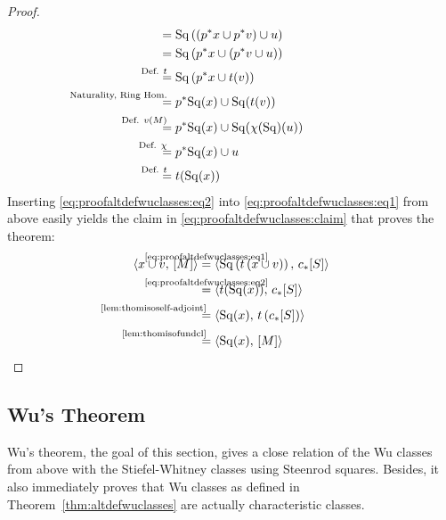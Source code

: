\begin{Thm}
\begin{proof}
\begin{align}
      &=
        \SQ\left(\left(\pb p x\cup \pb p\Vu\right) \cup \U\right)
      \\\notag
      &=
        \SQ\left(\pb p x\cup \left(\pb p\Vu \cup \U\right)\right)
      \\\notag
      &\equalsby{Def. $\thomiso$}
       \SQ\left(\pb p x\cup \thomiso(\Vu)\right)
      \\\notag
      &\equalsby{Naturality, Ring Hom.}
        \pb p\SQ(x) \cup \SQ(\thomiso(\Vu))
      \\\notag
      &\equalsby{Def. $\V{M}$}
        \pb p\SQ(x) \cup \SQ(\antipode(\SQ)(u))
      \\\notag
      &\equalsby{Def. $\antipode$}
        \pb p\SQ(x) \cup u
      \\\label{eq:proofaltdefwuclasses:eq2}
      &\equalsby{Def. $\thomiso$}
        \thomiso(\SQ(x))
    \end{align}
    Inserting \eqref{eq:proofaltdefwuclasses:eq2} into
    \eqref{eq:proofaltdefwuclasses:eq1} from above easily yields the
    claim in \eqref{eq:proofaltdefwuclasses:claim} that proves the theorem:
    \begin{align*}
      \capped{x\cup \Vu}{\fundcl M}
      &\cequalsby{\eqref{eq:proofaltdefwuclasses:eq1}}
        \capped
        {\SQ\left(\thomiso\left(x\cup\Vu\right)\right)}
        {\pf\collapse\fundcl{\Sph}}
      \\
      &\cequalsby{\eqref{eq:proofaltdefwuclasses:eq2}}
        \capped
        {\thomiso(\SQ(x))}
        {\pf\collapse\fundcl{\Sph}}
      \\
      &\equalsby{\ref{lem:thomisoself-adjoint}}
        \capped
        {\SQ(x)}
        {\thomiso\left(\pf\collapse\fundcl{\Sph}\right)}
      \\
      &\equalsby{\ref{lem:thomisofundcl}}
        \capped
        {\SQ(x)}
        {\fundcl M}
        \qedhere
    \end{align*}
  \end{proof}
\end{Thm}


\subsection{Wu's Theorem}\label{sec:wutheorem}
Wu's theorem, the goal of this section, gives a close relation of
the Wu classes from above with the Stiefel-Whitney classes using
Steenrod squares. Besides, it also immediately proves that Wu classes
as defined in Theorem~\ref{thm:altdefwuclasses} are actually characteristic
classes.

